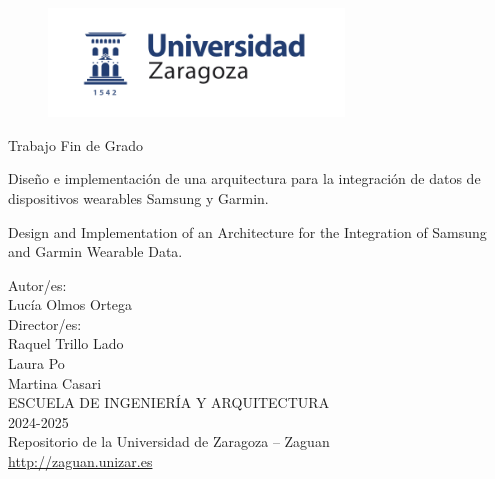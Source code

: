 \begin{titlepage}
\begin{figure}[h] 
    \centering
    \includegraphics[width=0.7\textwidth]{images/logoUZ.png} 
    \label{fig:mi_imagen}
\end{figure}
\begin{center}
    \begin{tcolorbox}[colframe=blue, colback=white, boxrule=0.5pt, arc=0pt]
        \centering
        {\huge Trabajo Fin de Grado}
    \end{tcolorbox}
\end{center}
    \vspace{2cm}
    
    {\Large \center Diseño e implementación de una arquitectura para la integración de datos de dispositivos wearables Samsung y Garmin. \par}
    
    \vspace{1cm}
    {\large \center Design and Implementation of an Architecture for the Integration of Samsung and Garmin Wearable Data. \par}
    
    \vspace{1.5cm}
    \centering \footnotesize {Autor/es:} \\
    \normalsize Lucía Olmos Ortega \\ 
    
    \vspace{0.5cm}
    \centering \footnotesize {Director/es:} \\
    \normalsize Raquel Trillo Lado \\ 
    \normalsize Laura Po \\ 
    \normalsize Martina Casari \\ 
    
    \vspace{0.5cm}
    \footnotesize ESCUELA DE INGENIERÍA Y ARQUITECTURA \\
    2024-2025 \\
    
    \vspace{0.5cm}
    \scriptsize Repositorio de la Universidad de Zaragoza – Zaguan \\
    \url{http://zaguan.unizar.es}
\end{titlepage}
